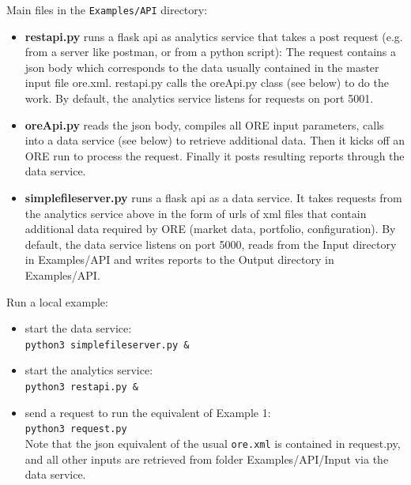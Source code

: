 \medskip
Main files in the {\tt Examples/API} directory:
\begin{itemize}
\item {\bf restapi.py} runs a flask api as analytics service that takes a post request
  (e.g. from a server like postman, or from a python script): The request contains a json body
  which corresponds to the data usually contained in the master input file ore.xml. restapi.py
  calls the oreApi.py class (see below) to do the work. By default, the analytics service listens for
  requests on port 5001.
\item {\bf oreApi.py} reads the json body, compiles all ORE input parameters, calls into a
  data service (see below) to retrieve additional data. Then it kicks off an ORE run to process
  the request.  Finally it posts resulting reports through the data service.
\item {\bf simplefileserver.py} runs a flask api as a data service. It takes requests from the
  analytics service above in the form of urls of xml files that contain additional data required
  by ORE (market data, portfolio, configuration). By default, the data service
  listens on port 5000, reads from the Input directory in Examples/API and writes reports to the Output
  directory in Examples/API.
\end{itemize}

\medskip
Run a local example:
\begin{itemize}
\item start the data service: \\
  {\tt python3 simplefileserver.py \&}
\item start the analytics service: \\
  {\tt python3 restapi.py \&}
\item send a request to run the equivalent of Example 1: \\
  {\tt python3 request.py} \\
  Note that the json equivalent of the usual {\tt ore.xml} is contained in request.py,
  and all other inputs are retrieved from folder Examples/API/Input via the data service.
\end{itemize}
